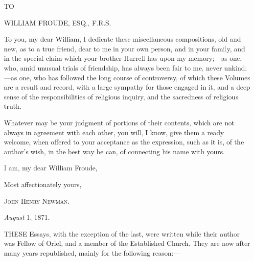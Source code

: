 



TO

WILLIAM FROUDE, ESQ., F.R.S.


To you, my dear William, I dedicate these miscellaneous
compositions, old and new, as to a true friend, dear to me in your own
person, and in your family, and in the special claim which your
brother Hurrell has upon my memory;—as one, who, amid unusual trials
of friendship, has always been fair to me, never unkind;—as one, who
has followed the long course of controversy, of which these Volumes
are a result and record, with a large sympathy for those engaged in
it, and a deep sense of the responsibilities of religious inquiry, and
the sacredness of religious truth.


Whatever may be your judgment of portions of their contents, which
are not always in agreement with each other, you will, I know, give
them a ready welcome, when offered to your acceptance as the
expression, such as it is, of the author's wish, in the best way he
can, of connecting his name with yours.


I am, my dear William Froude,

Most affectionately yours,

J\textsc{ohn} H\textsc{enry} N\textsc{ewman}.


\emph{August} 1, 1871.








THESE Essays, with the exception of the
last, were written while their author was Fellow of Oriel, and a
member of the Established Church. They are now after many years
republished, mainly for the following reason:—


